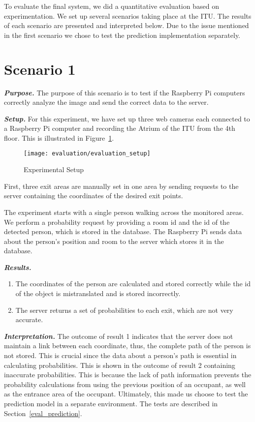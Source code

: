 To evaluate the final system, we did a quantitative evaluation based on experimentation. We set up several scenarios taking place at the ITU. The results of each scenario are presented and interpreted below. Due to the issue mentioned in the first scenario we chose to test the prediction implementation separately.

\section{Scenario 1}
\label{sec:scen1}
\textit{\textbf{Purpose.}} The purpose of this scenario is to test if the Raspberry Pi computers correctly analyze the image and send the correct data to the server.

\textit{\textbf{Setup.}} For this experiment, we have set up three web cameras each connected to a Raspberry Pi computer and recording the Atrium of the ITU from the 4th floor. This is illustrated in Figure~\ref{fig:evaluation_setup}.

\begin{figure}[htb]
	\centering
	\texttt{[image: evaluation/evaluation\_setup]}
	\caption{Experimental Setup}
	\label{fig:evaluation_setup}
\end{figure}

First, three exit areas are manually set in one area by sending requests to the server containing the coordinates of the desired exit points. 

The experiment starts with a single person walking across the monitored areas. We perform a probability request by providing a room id and the id of the detected person, which is stored in the database. The Raspberry Pi sends data about the person's position and room to the server which stores it in the database.

\textit{\textbf{Results.}}
\begin{enumerate}
\item The coordinates of the person are calculated and stored correctly while the id of the object is mistranslated and is stored incorrectly. 
\item The server returns a set of probabilities to each exit, which are not very accurate.
\end{enumerate}

\textit{\textbf{Interpretation.}} The outcome of result 1 indicates that the server does not maintain a link between each coordinate, thus, the complete path of the person is not stored. This is crucial since the data about a person's path is essential in calculating probabilities. This is shown in the outcome of result 2 containing inaccurate probabilities. This is because the lack of path information prevents the probability calculations from using the previous position of an occupant, as well as the entrance area of the occupant. Ultimately, this made us choose to test the prediction model in a separate environment. The tests are described in Section~\ref{eval_prediction}.

